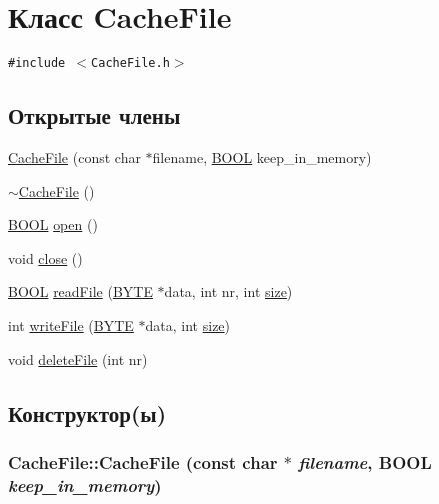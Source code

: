 \hypertarget{class_cache_file}{
\section{Класс CacheFile}
\label{class_cache_file}
}
{\tt \#include $<$CacheFile.h$>$}

\subsection*{Открытые члены}
\begin{CompactItemize}
\item 
\hyperlink{class_cache_file_7a018ff6f8416e7c797ca344df0e74e7}{CacheFile} (const char $\ast$filename, \hyperlink{filtration__run_2free_image_2_free_image_8h_975dbe9e4396bf9e0064ce01827fa372}{BOOL} keep\_\-in\_\-memory)
\item 
\hyperlink{class_cache_file_19596f187818008dad37012d2e7b9dd8}{$\sim$CacheFile} ()
\item 
\hyperlink{filtration__run_2free_image_2_free_image_8h_975dbe9e4396bf9e0064ce01827fa372}{BOOL} \hyperlink{class_cache_file_19854d9816d80a55a55176e90de9d6e6}{open} ()
\item 
void \hyperlink{class_cache_file_3ca771e4b8f81fb85a51067461630e77}{close} ()
\item 
\hyperlink{filtration__run_2free_image_2_free_image_8h_975dbe9e4396bf9e0064ce01827fa372}{BOOL} \hyperlink{class_cache_file_eb99cac63e110c6d21a5866200763fa9}{readFile} (\hyperlink{filtration__run_2free_image_2_free_image_8h_ae9749d96e15ccb4f482dd5f55d98f9b}{BYTE} $\ast$data, int nr, int \hyperlink{filtration__run_2free_image_2_free_image_8h_156878bfbcff0c64d75da712abe72bd6}{size})
\item 
int \hyperlink{class_cache_file_6c425a1386901f1760db7dc4992c2edb}{writeFile} (\hyperlink{filtration__run_2free_image_2_free_image_8h_ae9749d96e15ccb4f482dd5f55d98f9b}{BYTE} $\ast$data, int \hyperlink{filtration__run_2free_image_2_free_image_8h_156878bfbcff0c64d75da712abe72bd6}{size})
\item 
void \hyperlink{class_cache_file_8691ef7017c4e585b07201fae31b694e}{deleteFile} (int nr)
\end{CompactItemize}


\subsection{Конструктор(ы)}
\hypertarget{class_cache_file_7a018ff6f8416e7c797ca344df0e74e7}{
\subsubsection[{CacheFile}]{\setlength{\rightskip}{0pt plus 5cm}CacheFile::CacheFile (const char $\ast$ {\em filename}, \/  {\bf BOOL} {\em keep\_\-in\_\-memory})}}
\label{class_cache_file_7a018ff6f8416e7c797ca344df0e74e7}


